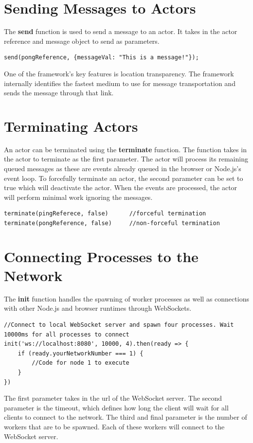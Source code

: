 \documentclass[12pt, a4paper]{report}
\theoremstyle{definition}
\theoremstyle{definition}%
\theoremstyle{definition}%
\theoremstyle{definition}%
\theoremstyle{definition}%
\theoremstyle{definition}%
\begin{document}
\section{Sending Messages to Actors}
The \textbf{send} function is used to send a message to an actor. It takes in the actor reference and message object to send as parameters.
\begin{lstlisting}
send(pongReference, {messageVal: "This is a message!"});
\end{lstlisting}
One of the framework's key features is location transparency. The framework internally identifies the fastest medium to use for message transportation and sends the message through that link.
\section{Terminating Actors}
An actor can be terminated using the \textbf{terminate} function. The function takes in the actor to terminate as the first parameter. The actor will process its remaining queued messages as these are events already queued in the browser or Node.js's event loop. To forcefully terminate an actor, the second parameter can be set to true which will deactivate the actor. When the events are processed, the actor will perform minimal work ignoring the messages.
\begin{lstlisting}
terminate(pingReferece, false)      //forceful termination
terminate(pongReference, false)     //non-forceful termination
\end{lstlisting}
\section{Connecting Processes to the Network}
The \textbf{init} function handles the spawning of worker processes as well as connections with other Node.js and browser runtimes through WebSockets.
\begin{lstlisting}
//Connect to local WebSocket server and spawn four processes. Wait 10000ms for all processes to connect
init('ws://localhost:8080', 10000, 4).then(ready => {
    if (ready.yourNetworkNumber === 1) {
        //Code for node 1 to execute
    }
})
\end{lstlisting}
 
The first parameter takes in the url of the WebSocket server. The second parameter is the timeout, which defines how long the client will wait for all clients to connect to the network. The third and final parameter is the number of workers that are to be spawned. Each of these workers will connect to the WebSocket server.
\end{document}
